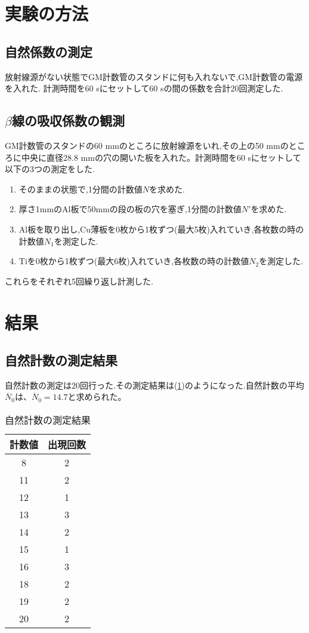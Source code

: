 \documentclass[a4j,10pt]{jarticle}
\begin{document}
  \section{実験の方法}
  \subsection{自然係数の測定}
  放射線源がない状態でGM計数管のスタンドに何も入れないで,GM計数管の電源を入れた.
  計測時間を60 sにセットして60 sの間の係数を合計20回測定した.

  \subsection{$\beta$線の吸収係数の観測}
  GM計数管のスタンドの60 mmのところに放射線源をいれ,その上の50 mmのところに中央に直径28.8 mmの穴の開いた板を入れた。計測時間を60 sにセットして以下の3つの測定をした.
  \begin{enumerate}
    \item そのままの状態で,1分間の計数値$N$を求めた.
    \item 厚さ1mmのAl板で50mmの段の板の穴を塞ぎ,1分間の計数値$N'$を求めた.
    \item Al板を取り出し,Cu薄板を0枚から1枚ずつ(最大5枚)入れていき,各枚数の時の計数値$N_1$を測定した.
    \item Tiを0枚から1枚ずつ(最大6枚)入れていき,各枚数の時の計数値$N_2$を測定した.
  \end{enumerate}
  これらをそれぞれ5回繰り返し計測した.
  \section{結果}
  \subsection{自然計数の測定結果}
  自然計数の測定は20回行った.その測定結果は(\ref{nt})のようになった.自然計数の平均$\overline{N}_0$は、$\overline{N}_0=14.7$と求められた。

        \begin{table}[h]
          \label{nt}
          \begin{center}
            \caption{自然計数の測定結果}
              \begin{tabular}{cc}
                \hline
                計数値 & 出現回数 \\ \hline
                8 & 2 \\
                11 & 2 \\
                12 & 1 \\
                13 & 3 \\
                14 & 2 \\
                15 & 1 \\
                16 & 3 \\
                18 & 2 \\
                19 & 2 \\
                20 & 2 \\
                \hline
              \end{tabular}
            \end{center}
        \end{table}
\end{document}
